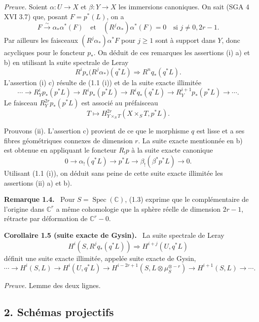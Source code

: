 \documentclass[11pt]{article}
\newenvironment{statement}[1]{\par\medskip\noindent\textbf{#1.}\ }{\par\medskip}
\begin{document}
\emph{Preuve.} Soient $\alpha:U\to X$ et $\beta:Y\to X$ les immersions canoniques. On sait (SGA 4 XVI 3.7) que, posant $F=p^*(L)$, on a
\[
F\xrightarrow{\sim}\alpha_*\alpha^*(F)
\quad\text{et}\quad
(R^j\alpha_*)\alpha^*(F)=0\quad\text{si }j\ne0,2r-1.
\]
Par ailleurs les faisceaux $(R^j\alpha_*)\alpha^*F$ pour $j\ge1$ sont à support dans $Y$, donc acycliques pour le foncteur $p_*$. On déduit de ces remarques les assertions (i) a) et b) en utilisant la suite spectrale de Leray
\[
R^i p_*\bigl(R^j\alpha_*\bigr)(q^*L)\Longrightarrow R^n q_*(q^*L).
\]
L'assertion (i) c) résulte de (1.1 (i)) et de la suite exacte illimitée
\[
\cdots\longrightarrow R_Y^i p_*(p^*L)\longrightarrow R^i p_*(p^*L)\longrightarrow R^i q_*(q^*L)
\longrightarrow R_Y^{i+1}p_*(p^*L)\longrightarrow\cdots.
\]
Le faisceau $R_Y^{2r}p_*(p^*L)$ est associé au préfaisceau
\[
T\longmapsto H^{2r}_{Y\times_S T}(X\times_S T,p^*L).
\]

Prouvons (ii). L'assertion c) provient de ce que le morphisme $q$ est lisse et a ses fibres géométriques connexes de dimension $r$. La suite exacte mentionnée en b) est obtenue en appliquant le foncteur $R_!p$ à la suite exacte canonique
\[
0\longrightarrow \alpha_!(q^*L)\longrightarrow p^*L\longrightarrow \beta_!(\beta^*p^*L)\longrightarrow 0.
\]
Utilisant (1.1 (i)), on déduit sans peine de cette suite exacte illimitée les assertions (ii) a) et b).

\begin{statement}{Remarque 1.4}
Pour $S=\operatorname{Spec}(\mathbb C)$, (1.3) exprime que le complémentaire de l'origine dans $\mathbb C^r$ a même cohomologie que la sphère réelle de dimension $2r-1$, rétracte par déformation de $\mathbb C^r-0$.
\end{statement}

\begin{statement}{Corollaire 1.5 (suite exacte de Gysin)}
La suite spectrale de Leray
\[
H^i(S,R^j q_*(q^*L))\Rightarrow H^{i+j}(U,q^*L)
\]
définit une suite exacte illimitée, appelée suite exacte de Gysin,
\[
\cdots\longrightarrow H^i(S,L)\longrightarrow H^i(U,q^*L)\longrightarrow
H^{i-2r+1}(S,L\otimes\mu_S^{\otimes -r})\longrightarrow H^{i+1}(S,L)\longrightarrow\cdots.
\]
\end{statement}

\emph{Preuve.} Lemme des deux lignes.

\subsection*{2. Schémas projectifs}
\end{document}
